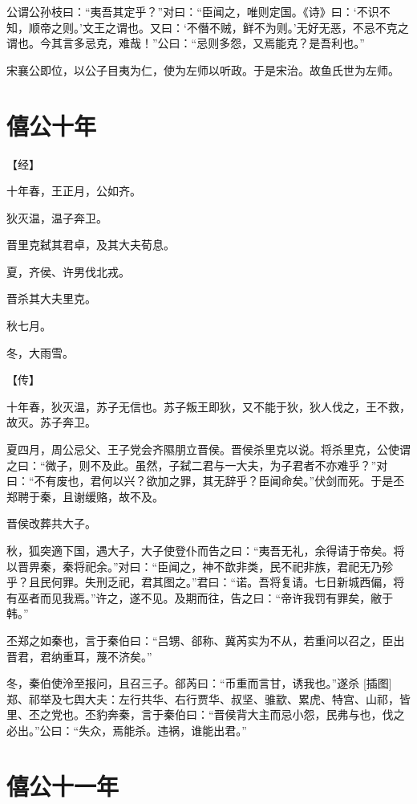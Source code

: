\documentclass[a4paper,12pt,UTF8,twoside]{ctexbook}
\begin{document}
公谓公孙枝曰：“夷吾其定乎？”对曰：“臣闻之，唯则定国。《诗》曰：‘不识不知，顺帝之则。’文王之谓也。又曰：‘不僭不贼，鲜不为则。’无好无恶，不忌不克之谓也。今其言多忌克，难哉！”公曰：“忌则多怨，又焉能克？是吾利也。”

宋襄公即位，以公子目夷为仁，使为左师以听政。于是宋治。故鱼氏世为左师。

\section{僖公十年}



【经】

十年春，王正月，公如齐。

狄灭温，温子奔卫。

晋里克弑其君卓，及其大夫荀息。

夏，齐侯、许男伐北戎。

晋杀其大夫里克。

秋七月。

冬，大雨雪。

【传】

十年春，狄灭温，苏子无信也。苏子叛王即狄，又不能于狄，狄人伐之，王不救，故灭。苏子奔卫。

夏四月，周公忌父、王子党会齐隰朋立晋侯。晋侯杀里克以说。将杀里克，公使谓之曰：“微子，则不及此。虽然，子弑二君与一大夫，为子君者不亦难乎？”对曰：“不有废也，君何以兴？欲加之罪，其无辞乎？臣闻命矣。”伏剑而死。于是丕郑聘于秦，且谢缓赂，故不及。

晋侯改葬共大子。

秋，狐突適下国，遇大子，大子使登仆而告之曰：“夷吾无礼，余得请于帝矣。将以晋畀秦，秦将祀余。”对曰：“臣闻之，神不歆非类，民不祀非族，君祀无乃殄乎？且民何罪。失刑乏祀，君其图之。”君曰：“诺。吾将复请。七日新城西偏，将有巫者而见我焉。”许之，遂不见。及期而往，告之曰：“帝许我罚有罪矣，敝于韩。”

丕郑之如秦也，言于秦伯曰：“吕甥、郤称、冀芮实为不从，若重问以召之，臣出晋君，君纳重耳，蔑不济矣。”

冬，秦伯使泠至报问，且召三子。郤芮曰：“币重而言甘，诱我也。”遂杀 [插图]郑、祁举及七舆大夫：左行共华、右行贾华、叔坚、骓歂、累虎、特宫、山祁，皆里、丕之党也。丕豹奔秦，言于秦伯曰：“晋侯背大主而忌小怨，民弗与也，伐之必出。”公曰：“失众，焉能杀。违祸，谁能出君。”


\section{僖公十一年}
\end{document}
